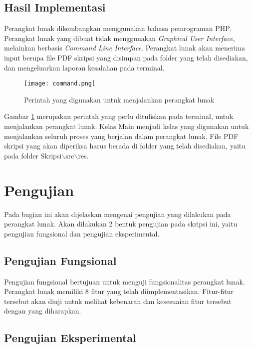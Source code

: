 \subsection{Hasil Implementasi}
Perangkat lunak dikembangkan menggunakan bahasa pemrograman PHP. Perangkat lunak yang dibuat tidak menggunakan \textit{Graphical User Interface}, melainkan berbasis \textit{Command Line Interface}. Perangkat lunak akan menerima input berupa file PDF skripsi yang disimpan pada folder yang telah disediakan, dan mengeluarkan laporan kesalahan pada terminal.

\begin{figure}[H]
	\centering	
	\texttt{[image: command.png]}
	\caption{Perintah yang digunakan untuk menjalankan perangkat lunak}	
	\label{fig:command} 
\end{figure}

Gambar \ref{fig:command} merupakan perintah yang perlu dituliskan pada terminal, untuk menjalankan perangkat lunak. Kelas Main menjadi kelas yang digunakan untuk menjalankan seluruh proses yang berjalan dalam perangkat lunak. File PDF skripsi yang akan diperiksa harus berada di folder yang telah disediakan, yaitu pada folder Skripsi$\backslash$src$\backslash$res.

\section{Pengujian}
Pada bagian ini akan dijelaskan mengenai pengujian yang dilakukan pada perangkat lunak. Akan dilakukan 2 bentuk pengujian pada skripsi ini, yaitu pengujian fungsional dan pengujian eksperimental.

\subsection{Pengujian Fungsional}
Pengujian fungsional bertujuan untuk menguji fungsionalitas perangkat lunak. Perangkat lunak memiliki 8 fitur yang telah diimplementasikan. Fitur-fitur tersebut akan diuji untuk melihat kebenaran dan kesesuaian fitur tersebut dengan yang diharapkan.

\subsection{Pengujian Eksperimental}

